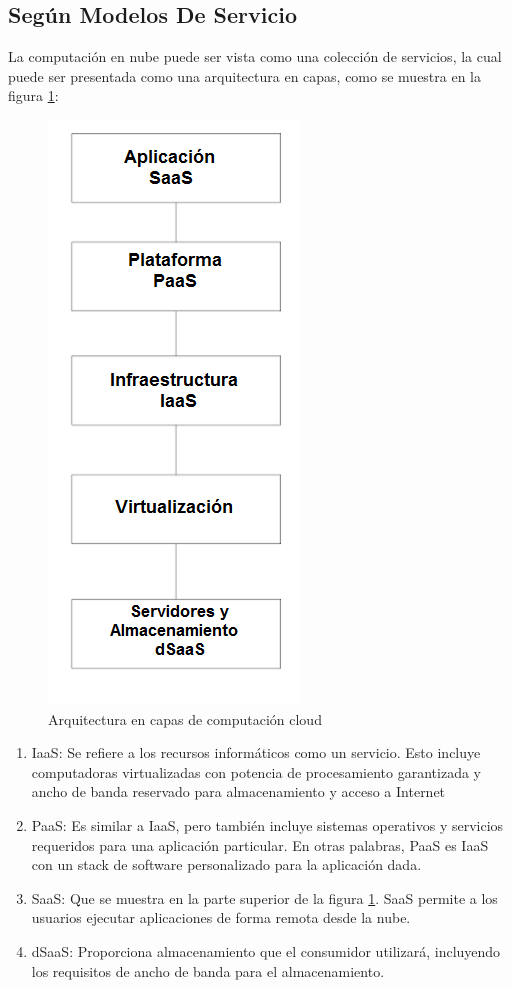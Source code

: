 \documentclass[a4paper, 12pt]{report}
\begin{document}
\subsection{Seg\'un Modelos De Servicio}
\begin{justify}
La computación en nube puede ser vista como una colección de servicios, la cual puede ser presentada como una arquitectura en capas, como se muestra en la figura \ref{fig:capas1}:
\begin{figure}[ht]
	\begin{center}
		\includegraphics[width=.3\textwidth]{cloudcapas}
		\caption{Arquitectura en capas de computaci\'on cloud \cite{handbook}}
		\label{fig:capas1}
	\end{center}
\end{figure}
\begin{enumerate}[label=\alph*)]
    \item{IaaS:} Se refiere a los recursos informáticos como un servicio. Esto incluye computadoras virtualizadas con potencia de procesamiento garantizada y ancho de banda reservado para almacenamiento y acceso a Internet
    \item{PaaS:} Es similar a IaaS, pero también incluye sistemas operativos y servicios requeridos para una aplicación particular. En otras palabras, PaaS es IaaS con un stack de software personalizado para la aplicación dada.
    \item{SaaS:} Que se muestra en la parte superior de la figura \ref{fig:capas1}. SaaS permite a los usuarios ejecutar aplicaciones de forma remota desde la nube.
    \item{dSaaS:} Proporciona almacenamiento que el consumidor utilizar\'a, incluyendo los requisitos de ancho de banda para el almacenamiento.
\end{enumerate}
\end{justify}
\end{document}
